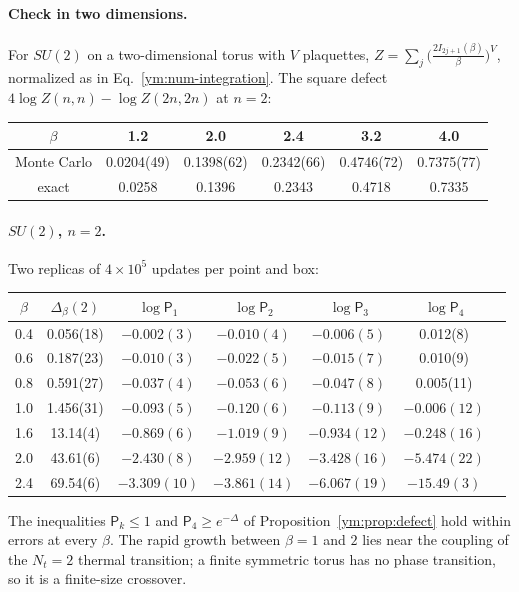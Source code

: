 \paragraph{Check in two dimensions.} For $SU(2)$ on a two-dimensional torus with
$V$ plaquettes, $Z=\sum_{j}\big(\frac{2I_{2j+1}(\beta)}{\beta}\big)^V$, normalized
as in Eq.~\eqref{ym:num-integration}. The square defect
$4\log Z(n,n)-\log Z(2n,2n)$ at $n=2$:
\begin{center}
\begin{tabular}{cccccc}
$\beta$ & 1.2 & 2.0 & 2.4 & 3.2 & 4.0\\\hline
Monte Carlo & 0.0204(49) & 0.1398(62) & 0.2342(66) & 0.4746(72) & 0.7375(77)\\
exact & 0.0258 & 0.1396 & 0.2343 & 0.4718 & 0.7335
\end{tabular}
\end{center}

\paragraph{$SU(2)$, $n=2$.} Two replicas of $4\times10^5$ updates per point
and box:
\begin{center}
\begin{tabular}{ccccccc}
$\beta$ & $\Delta_\beta(2)$ & $\log\mathsf P_1$ & $\log\mathsf P_2$ &
 $\log\mathsf P_3$ & $\log\mathsf P_4$\\\hline
0.4 & 0.056(18) & $-0.002(3)$ & $-0.010(4)$ & $-0.006(5)$ & 0.012(8)\\
0.6 & 0.187(23) & $-0.010(3)$ & $-0.022(5)$ & $-0.015(7)$ & 0.010(9)\\
0.8 & 0.591(27) & $-0.037(4)$ & $-0.053(6)$ & $-0.047(8)$ & 0.005(11)\\
1.0 & 1.456(31) & $-0.093(5)$ & $-0.120(6)$ & $-0.113(9)$ & $-0.006(12)$\\
1.6 & 13.14(4) & $-0.869(6)$ & $-1.019(9)$ & $-0.934(12)$ & $-0.248(16)$\\
2.0 & 43.61(6) & $-2.430(8)$ & $-2.959(12)$ & $-3.428(16)$ & $-5.474(22)$\\
2.4 & 69.54(6) & $-3.309(10)$ & $-3.861(14)$ & $-6.067(19)$ & $-15.49(3)$
\end{tabular}
\end{center}
The inequalities $\mathsf P_k\le1$ and $\mathsf P_4\ge e^{-\Delta}$ of
Proposition~\ref{ym:prop:defect} hold within errors at every $\beta$. The rapid
growth between $\beta=1$ and $2$ lies near the coupling of the $N_t=2$
thermal transition; a finite symmetric torus has no phase transition, so it is
a finite-size crossover.

